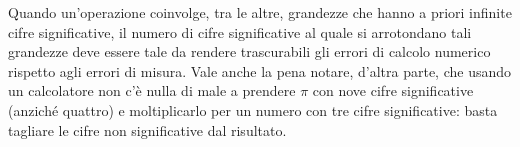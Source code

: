 Quando un'operazione coinvolge, tra le altre, grandezze che hanno a priori
infinite cifre significative, il numero di cifre significative al quale si
arrotondano tali grandezze deve essere tale da rendere trascurabili gli
errori di calcolo numerico rispetto agli errori di misura.
Vale anche la pena notare, d'altra parte, che usando un calcolatore non
c'\`e nulla di male a prendere $\pi$ con nove cifre significative
(anzich\'e quattro) e moltiplicarlo per un numero con tre cifre significative:
basta tagliare le cifre non significative dal risultato.
\normalsize

